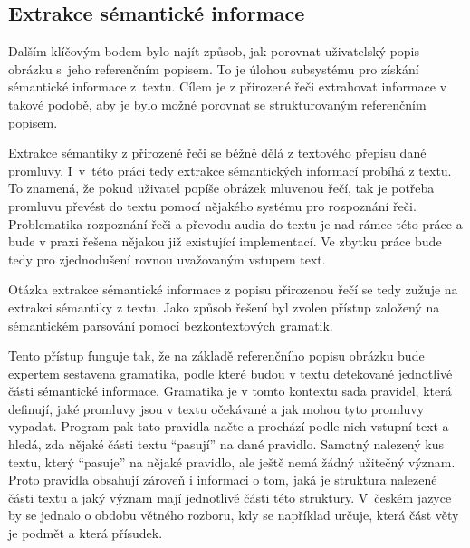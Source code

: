 \subsection{Extrakce sémantické informace}\label{subsec:extrakce_semanticke_informace}
Dalším klíčovým bodem bylo najít způsob, jak porovnat uživatelský popis obrázku s~jeho referenčním popisem.
To je úlohou subsystému pro získání sémantické informace z~textu.
Cílem je z přirozené řeči extrahovat informace v takové podobě, aby je bylo možné porovnat se strukturovaným referenčním popisem.


Extrakce sémantiky z přirozené řeči se běžně dělá z textového přepisu dané promluvy.
I~v~této práci tedy extrakce sémantických informací probíhá z textu.
To znamená, že pokud uživatel popíše obrázek mluvenou řečí, tak je potřeba promluvu převést do textu pomocí nějakého systému pro rozpoznání řeči.
Problematika rozpoznání řeči a převodu audia do textu je nad rámec této práce a bude v praxi řešena nějakou již existující implementací.
Ve zbytku práce bude tedy pro zjednodušení rovnou uvažovaným vstupem text.

Otázka extrakce sémantické informace z popisu přirozenou řečí se tedy zužuje na extrakci sémantiky z textu.
Jako způsob řešení byl zvolen přístup založený na sémantickém parsování pomocí bezkontextových gramatik.

Tento přístup funguje tak, že na základě referenčního popisu obrázku bude expertem sestavena gramatika,
podle které budou v textu detekované jednotlivé části sémantické informace.
Gramatika je v tomto kontextu sada pravidel, která definují, jaké promluvy jsou v textu očekávané a jak mohou tyto promluvy vypadat.
Program pak tato pravidla načte a prochází podle nich vstupní text a hledá, zda nějaké části textu \enquote{pasují} na dané pravidlo.
Samotný nalezený kus textu, který \enquote{pasuje} na nějaké pravidlo, ale ještě nemá žádný užitečný význam.
Proto pravidla obsahují zároveň i informaci o tom, jaká je struktura nalezené části textu a jaký význam mají jednotlivé části této struktury.
V~českém jazyce by se jednalo o obdobu větného rozboru, kdy se například určuje, která část věty je podmět a která přísudek.

